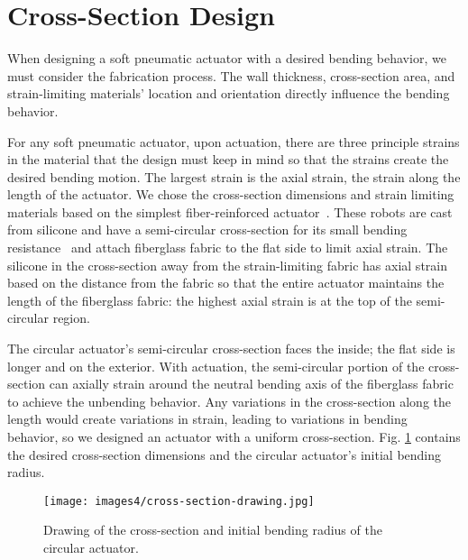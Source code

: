 \section{Cross-Section Design}

When designing a soft pneumatic actuator with a desired bending behavior, we must consider the fabrication process. The wall thickness, cross-section area, and strain-limiting materials' location and orientation directly influence the bending behavior. 

For any soft pneumatic actuator, upon actuation, there are three principle strains in the material that the design must keep in mind so that the strains create the desired bending motion. The largest strain is the axial strain, the strain along the length of the actuator. We chose the cross-section dimensions and strain limiting materials based on the simplest fiber-reinforced actuator~\cite{galloway_mechanically_2013}. These robots are cast from silicone and have a semi-circular cross-section for its small bending resistance~\cite{polygerinos_modeling_2015} and attach fiberglass fabric to the flat side to limit axial strain. The silicone in the cross-section away from the strain-limiting fabric has axial strain based on the distance from the fabric so that the entire actuator maintains the length of the fiberglass fabric: the highest axial strain is at the top of the semi-circular region.  

The circular actuator's semi-circular cross-section faces the inside; the flat side is longer and on the exterior. With actuation, the semi-circular portion of the cross-section can axially strain around the neutral bending axis of the fiberglass fabric to achieve the unbending behavior. Any variations in the cross-section along the length would create variations in strain, leading to variations in bending behavior, so we designed an actuator with a uniform cross-section. Fig. \ref{fig:crosssection} contains the desired cross-section dimensions and the circular actuator's initial bending radius. 

\begin{figure}[!ht]
    \centering
    \texttt{[image: images4/cross-section-drawing.jpg]}
    \caption{Drawing of the cross-section and initial bending radius of the circular actuator.}
    \label{fig:crosssection}
\end{figure}